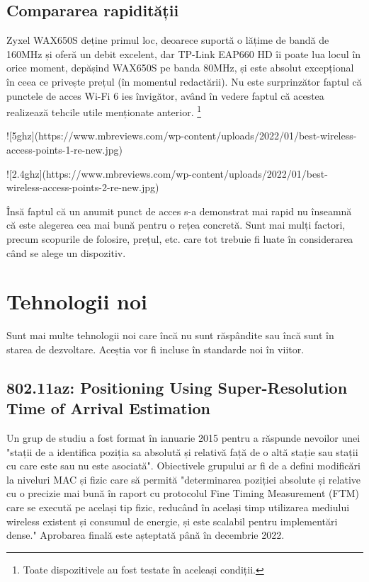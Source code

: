 \documentclass[a4paper,12pt]{report}
\def\oldchapter{} \let\oldchapter=\chapter{}
\def\chapter{\stepcounter{num_chapters}\oldchapter}
\begin{document}
\section{Compararea rapidității}

Zyxel WAX650S deține primul loc, deoarece suportă o lățime de bandă de 160MHz și oferă un debit excelent, dar TP-Link EAP660 HD îi poate lua locul în orice moment, depășind WAX650S pe banda 80MHz, și este absolut excepțional în ceea ce privește prețul (în momentul redactării).
Nu este surprinzător faptul că punctele de acces Wi-Fi 6 ies învigător, având în vedere faptul că acestea realizează tehcile utile menționate anterior. \footnote{Toate dispozitivele au fost testate în aceleași condiții.}

![5ghz](https://www.mbreviews.com/wp-content/uploads/2022/01/best-wireless-access-points-1-re-new.jpg)

![2.4ghz](https://www.mbreviews.com/wp-content/uploads/2022/01/best-wireless-access-points-2-re-new.jpg)


Însă faptul că un anumit punct de acces s-a demonstrat mai rapid nu înseamnă că este alegerea cea mai bună pentru o rețea concretă. Sunt mai mulți factori, precum scopurile de folosire, prețul, etc. care tot trebuie fi luate în considerarea când se alege un dispozitiv.


\chapter{Tehnologii noi}

Sunt mai multe tehnologii noi care încă nu sunt răspândite sau încă sunt în starea de dezvoltare.
Aceștia vor fi incluse în standarde noi în viitor.

\section{802.11az: Positioning Using Super-Resolution Time of Arrival Estimation}

Un grup de studiu a fost format în ianuarie 2015 pentru a răspunde nevoilor unei "stații de a identifica poziția sa absolută și relativă față de o altă stație sau stații cu care este sau nu este asociată".
Obiectivele grupului ar fi de a defini modificări la niveluri MAC și fizic care să permită "determinarea poziției absolute și relative cu o precizie mai bună în raport cu protocolul Fine Timing Measurement (FTM) care se execută pe același tip fizic, reducând în același timp utilizarea mediului wireless existent și consumul de energie, și este scalabil pentru implementări dense."
Aprobarea finală este așteptată până în decembrie 2022.
\end{document}
